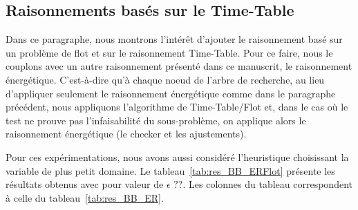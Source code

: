 \subsection{Raisonnements basés sur le Time-Table}
\label{sec:expe_TT}

Dans ce paragraphe, nous montrons l'intérêt d'ajouter le
raisonnement basé sur un problème de flot et sur le raisonnement
Time-Table. Pour ce faire, nous le couplons avec un autre raisonnement
présenté dans ce manuscrit, le raisonnement énergétique. C'est-à-dire
qu'à chaque noeud de l'arbre de recherche, au lieu d'appliquer
seulement le raisonnement énergétique comme dans le paragraphe
précédent, nous appliquons l'algorithme de Time-Table/Flot et, dans
le cas où le test ne prouve pas l'infaisabilité du sous-problème, on
applique alors le raisonnement énergétique (le checker et les
ajustements). 

Pour ces expérimentations, nous avons aussi considéré l'heuristique
choisissant la variable de plus petit domaine.   Le
tableau~\ref{tab:res_BB_ERFlot} présente les résultats obtenus avec  
pour valeur de $\epsilon$ $??$. Les colonnes du tableau correspondent
à celle du tableau~\ref{tab:res_BB_ER}. 

